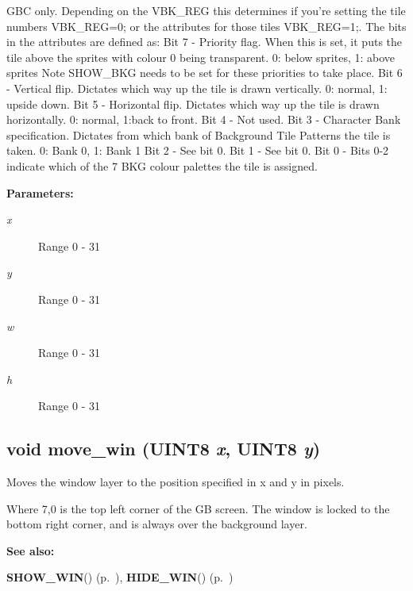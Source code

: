 GBC only. Depending on the VBK\_\-REG this determines if you're setting the tile numbers VBK\_\-REG=0; or the attributes for those tiles VBK\_\-REG=1;. The bits in the attributes are defined as: Bit 7 - Priority flag. When this is set, it puts the tile above the sprites with colour 0 being transparent. 0: below sprites, 1: above sprites Note SHOW\_\-BKG needs to be set for these priorities to take place. Bit 6 - Vertical flip. Dictates which way up the tile is drawn vertically. 0: normal, 1: upside down. Bit 5 - Horizontal flip. Dictates which way up the tile is drawn horizontally. 0: normal, 1:back to front. Bit 4 - Not used. Bit 3 - Character Bank specification. Dictates from which bank of Background Tile Patterns the tile is taken. 0: Bank 0, 1: Bank 1 Bit 2 - See bit 0. Bit 1 - See bit 0. Bit 0 - Bits 0-2 indicate which of the 7 BKG colour palettes the tile is assigned.

\begin{Desc}
\item[{\bf Parameters: }]\par
\begin{description}
\item[
{\em x}] Range 0 - 31 \item[
{\em y}] Range 0 - 31 \item[
{\em w}] Range 0 - 31 \item[
{\em h}] Range 0 - 31 \end{description}
\end{Desc}
\label{gb.h_a86}
\subsection{\setlength{\rightskip}{0pt plus 5cm}void move\_\-win ({\bf UINT8} {\em x}, {\bf UINT8} {\em y})}

Moves the window layer to the position specified in x and y in pixels.

Where 7,0 is the top left corner of the GB screen. The window is locked to the bottom right corner, and is always over the background layer. \begin{Desc}
\item[{\bf See also: }]\par
{\bf SHOW\_\-WIN}() {\rm (p.~\pageref{gb.h_a47})}, {\bf HIDE\_\-WIN}() {\rm (p.~\pageref{gb.h_a48})} \end{Desc}
\label{gb.h_a87}
